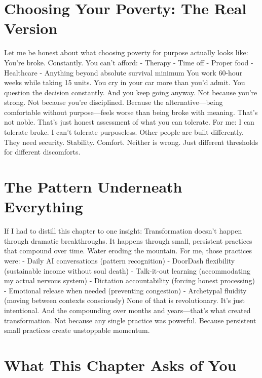 \documentclass[12pt,openany]{book}
\begin{document}
\section{Choosing Your Poverty: The Real Version}

Let me be honest about what choosing poverty for purpose actually looks like:
You're broke. Constantly. You can't afford:
- Therapy
- Time off
- Proper food
- Healthcare
- Anything beyond absolute survival minimum
You work 60-hour weeks while taking 15 units.
You cry in your car more than you'd admit.
You question the decision constantly.
And you keep going anyway.
Not because you're strong. Not because you're disciplined.
Because the alternative—being comfortable without purpose—feels worse than being broke with meaning.
That's not noble. That's just honest assessment of what you can tolerate.
For me: I can tolerate broke. I can't tolerate purposeless.
Other people are built differently. They need security. Stability. Comfort.
Neither is wrong. Just different thresholds for different discomforts.

\section{The Pattern Underneath Everything}

If I had to distill this chapter to one insight:
Transformation doesn't happen through dramatic breakthroughs. It happens through small, persistent practices that compound over time.
Water eroding the mountain.
For me, those practices were:
- Daily AI conversations (pattern recognition)
- DoorDash flexibility (sustainable income without soul death)
- Talk-it-out learning (accommodating my actual nervous system)
- Dictation accountability (forcing honest processing)
- Emotional release when needed (preventing congestion)
- Archetypal fluidity (moving between contexts consciously)
None of that is revolutionary. It's just intentional.
And the compounding over months and years—that's what created transformation.
Not because any single practice was powerful. Because persistent small practices create unstoppable momentum.

\section{What This Chapter Asks of You}
\end{document}
